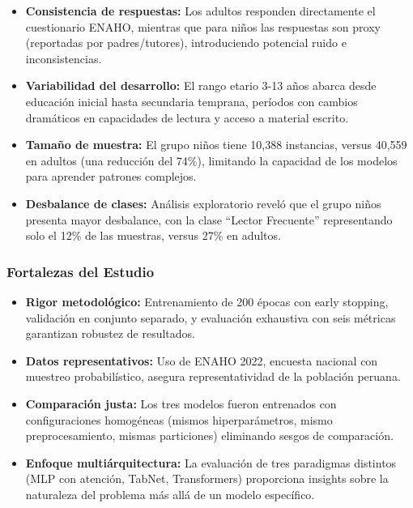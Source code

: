 \documentclass[12pt,a4paper]{article}
\begin{document}
\begin{itemize}
    \item \textbf{Consistencia de respuestas:} Los adultos responden directamente el cuestionario ENAHO, mientras que para niños las respuestas son proxy (reportadas por padres/tutores), introduciendo potencial ruido e inconsistencias.
    
    \item \textbf{Variabilidad del desarrollo:} El rango etario 3-13 años abarca desde educación inicial hasta secundaria temprana, períodos con cambios dramáticos en capacidades de lectura y acceso a material escrito.
    
    \item \textbf{Tamaño de muestra:} El grupo niños tiene 10,388 instancias, versus 40,559 en adultos (una reducción del 74\%), limitando la capacidad de los modelos para aprender patrones complejos.
    
    \item \textbf{Desbalance de clases:} Análisis exploratorio reveló que el grupo niños presenta mayor desbalance, con la clase ``Lector Frecuente'' representando solo el 12\% de las muestras, versus 27\% en adultos.
\end{itemize}

\subsubsection{Fortalezas del Estudio}

\begin{itemize}
    \item \textbf{Rigor metodológico:} Entrenamiento de 200 épocas con early stopping, validación en conjunto separado, y evaluación exhaustiva con seis métricas garantizan robustez de resultados.
    
    \item \textbf{Datos representativos:} Uso de ENAHO 2022, encuesta nacional con muestreo probabilístico, asegura representatividad de la población peruana.
    
    \item \textbf{Comparación justa:} Los tres modelos fueron entrenados con configuraciones homogéneas (mismos hiperparámetros, mismo preprocesamiento, mismas particiones) eliminando sesgos de comparación.
    
    \item \textbf{Enfoque multiárquitectura:} La evaluación de tres paradigmas distintos (MLP con atención, TabNet, Transformers) proporciona insights sobre la naturaleza del problema más allá de un modelo específico.
\end{itemize}
\end{document}
